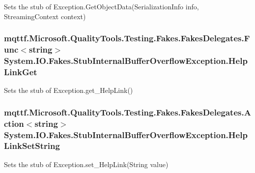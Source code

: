 Sets the stub of Exception.\-Get\-Object\-Data(\-Serialization\-Info info, Streaming\-Context context)

\hypertarget{class_system_1_1_i_o_1_1_fakes_1_1_stub_internal_buffer_overflow_exception_a940db26a92ab8b208668c0c0833af33b}{
\subsubsection[{Help\-Link\-Get}]{\setlength{\rightskip}{0pt plus 5cm}mqttf.\-Microsoft.\-Quality\-Tools.\-Testing.\-Fakes.\-Fakes\-Delegates.\-Func$<$string$>$ System.\-I\-O.\-Fakes.\-Stub\-Internal\-Buffer\-Overflow\-Exception.\-Help\-Link\-Get}}\label{class_system_1_1_i_o_1_1_fakes_1_1_stub_internal_buffer_overflow_exception_a940db26a92ab8b208668c0c0833af33b}


Sets the stub of Exception.\-get\-\_\-\-Help\-Link()

\hypertarget{class_system_1_1_i_o_1_1_fakes_1_1_stub_internal_buffer_overflow_exception_a6055f052a7ae9000edbb85b14cdf77ab}{
\subsubsection[{Help\-Link\-Set\-String}]{\setlength{\rightskip}{0pt plus 5cm}mqttf.\-Microsoft.\-Quality\-Tools.\-Testing.\-Fakes.\-Fakes\-Delegates.\-Action$<$string$>$ System.\-I\-O.\-Fakes.\-Stub\-Internal\-Buffer\-Overflow\-Exception.\-Help\-Link\-Set\-String}}\label{class_system_1_1_i_o_1_1_fakes_1_1_stub_internal_buffer_overflow_exception_a6055f052a7ae9000edbb85b14cdf77ab}


Sets the stub of Exception.\-set\-\_\-\-Help\-Link(\-String value)


